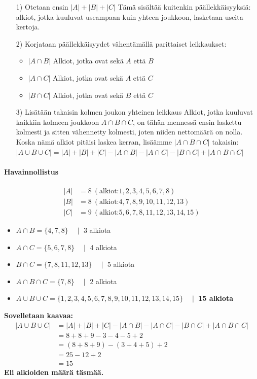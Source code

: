 \documentclass{article}
\begin{document}
\begin{itemize}
    \item[1)] Otetaan ensin $|A| + |B| + |C|$ Tämä sisältää kuitenkin päällekkäisyyksiä: alkiot, jotka kuuluvat useampaan kuin yhteen joukkoon, lasketaan useita kertoja.
    \item[2)] Korjataan päällekkäisyydet vähentämällä parittaiset leikkaukset:
    \begin{itemize}
        \item $|A \cap B|$ Alkiot, jotka ovat sekä $A$ että $B$
        \item $|A \cap C|$ Alkiot, jotka ovat sekä $A$ että $C$
        \item $|B \cap C|$ Alkiot, jotka ovat sekä $B$ että $C$
    \end{itemize}
    \item[3)] Lisätään takaisin kolmen joukon yhteinen leikkaus\newline
    Alkiot, jotka kuuluvat kaikkiin kolmeen joukkoon $A \cap B \cap C$, on tähän mennessä ensin laskettu kolmesti ja sitten vähennetty kolmesti, joten niiden nettomäärä on nolla.\newline
    Koska nämä alkiot pitäisi laskea kerran, lisäämme $|A \cap B \cap C|$ takaisin:
    $|A \cup B \cup C| = |A| + |B| + |C| - |A \cap B| - |A \cap C| - |B \cap C| + |A \cap B \cap C|$
\end{itemize}
\pagebreak
\paragraph*{Havainnollistus}
\[
    \begin{aligned}
        |A| &= 8 \ (\text{alkiot:} 1, 2, 3, 4, 5, 6, 7, 8)\\
        |B| &= 8 \ (\text{alkiot:} 4, 7, 8, 9, 10, 11, 12, 13)\\
        |C| &= 9 \ (\text{alkiot:} 5, 6, 7, 8, 11, 12, 13, 14, 15)
    \end{aligned}
\]
\begin{itemize}
    \item $A \cap B = \{4, 7, 8\} \quad \mid$ 3 alkiota
    \item $A \cap C = \{5, 6, 7, 8\} \quad \mid$ 4 alkiota
    \item $B \cap C = \{7, 8, 11, 12, 13\} \quad \mid$ 5 alkiota
    \item $A \cap B \cap C = \{7, 8\} \quad \mid$ 2 alkiota
    \item $A \cup B \cup C = \{1, 2, 3, 4, 5, 6, 7, 8, 9, 10, 11, 12, 13, 14, 15\} \quad \mid$ \textbf{15 alkiota}
\end{itemize}
\textbf{Sovelletaan kaavaa:}
\[
\begin{aligned}
    |A \cup B \cup C| &= |A| + |B| + |C| - |A \cap B| - |A \cap C| - |B \cap C| + |A \cap B \cap C| \\
    &= 8 + 8 + 9 - 3 - 4 - 5 + 2 \\
    &= (8 + 8 + 9) - (3 + 4 + 5) + 2 \\
    &= 25 - 12 + 2 \\
    &= 15
\end{aligned}
\]    
\textbf{Eli alkioiden määrä täsmää.}
\end{document}
